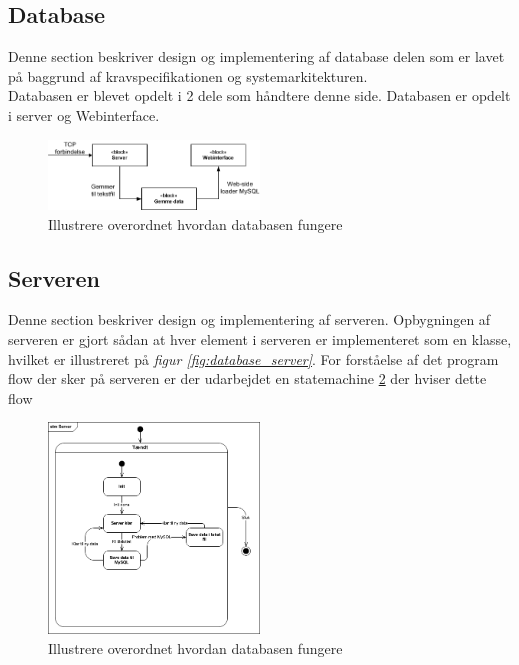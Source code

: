 \subsection{Database}
Denne section beskriver design og implementering af database delen som er lavet på baggrund af kravspecifikationen og systemarkitekturen.\\
Databasen er blevet opdelt i 2 dele som håndtere denne side. Databasen er opdelt i server og Webinterface.
\begin{figure}[H]
\centering
\includegraphics[width = 0.5\textwidth]{billeder/database_to_mysql}
\caption{Illustrere overordnet hvordan databasen fungere}
\label{fig:server_to_mysql}
\end{figure}

\subsection{Serveren}
Denne section beskriver design og implementering af serveren.
Opbygningen af serveren er gjort sådan at hver element i serveren er implementeret som en klasse, hvilket er illustreret på \textit{figur \ref{fig:database_server}}. For forståelse af det program flow der sker på serveren er der udarbejdet en statemachine \ref{fig:stm_server} der hviser dette flow
\begin{figure}[H]
\centering
\includegraphics[width = 0.5\textwidth]{billeder/Systemarkitektur/stm_server}
\caption{Illustrere overordnet hvordan databasen fungere}
\label{fig:stm_server}
\end{figure}

